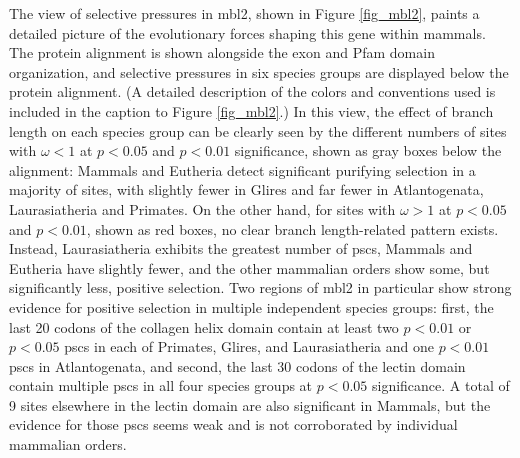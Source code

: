 The \sw view of selective pressures in \ac{mbl2}, shown in Figure
\ref{fig_mbl2}, paints a detailed picture of the evolutionary forces
shaping this gene within mammals. The protein alignment is shown
alongside the exon and Pfam domain organization, and \sw selective
pressures in six species groups are displayed below the protein
alignment. (A detailed description of the colors and conventions used
is included in the caption to Figure \ref{fig_mbl2}.) In this view,
the effect of branch length on each species group can be clearly seen
by the different numbers of sites with $\omega<1$ at $p<0.05$ and
$p<0.01$ significance, shown as gray boxes below the alignment:
Mammals and Eutheria detect significant purifying selection in a
majority of sites, with slightly fewer in Glires and far fewer in
Atlantogenata, Laurasiatheria and Primates. On the other hand, for
sites with $\omega>1$ at $p<0.05$ and $p<0.01$, shown as red boxes, no
clear branch length-related pattern exists. Instead, Laurasiatheria
exhibits the greatest number of \acp{psc}, Mammals and Eutheria have
slightly fewer, and the other mammalian orders show some, but
significantly less, positive selection. Two regions of \ac{mbl2} in
particular show strong evidence for positive selection in multiple
independent species groups: first, the last 20 codons of the collagen
helix domain contain at least two $p<0.01$ or $p<0.05$ \acp{psc} in
each of Primates, Glires, and Laurasiatheria and one $p<0.01$
\acp{psc} in Atlantogenata, and second, the last 30 codons of the
lectin domain contain multiple \acp{psc} in all four species groups at
$p<0.05$ significance. A total of 9 sites elsewhere in the lectin
domain are also significant in Mammals, but the evidence for those
\acp{psc} seems weak and is not corroborated by individual mammalian
orders.

